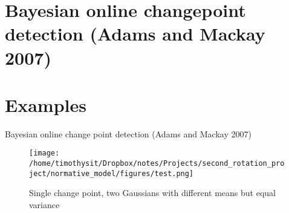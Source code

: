 \documentclass[presentation]{beamer}
\begin{document}
\section{Bayesian online changepoint detection (Adams and Mackay 2007)}
\label{sec:org97dccbb}


\section{Examples}
\label{sec:org3e80f30}

\begin{frame}[label={sec:org1b220c1}]{Bayesian online change point detection (Adams and Mackay 2007)}
\begin{figure}[htbp]
\centering
\texttt{[image: /home/timothysit/Dropbox/notes/Projects/second\_rotation\_project/normative\_model/figures/test.png]}
\caption{Single change point, two Gaussians with different means but equal variance}
\end{figure}
\end{frame}
\end{document}
